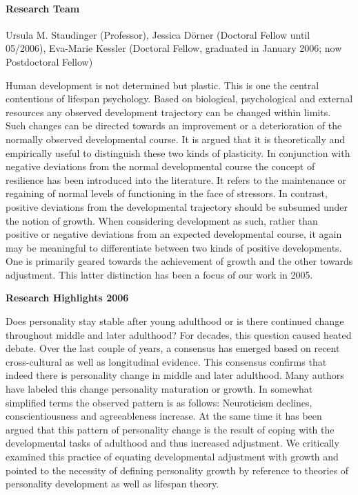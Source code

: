 


\paragraph{Research Team}
Ursula M. Staudinger (Professor), Jessica D\"orner (Doctoral Fellow until 05/2006), Eva-Marie Kessler (Doctoral Fellow, graduated in January 2006; now Postdoctoral Fellow)

Human development is not determined but plastic. This is one the central contentions of lifespan psychology. Based on biological, psychological and external resources any observed development trajectory can be changed within limits. Such changes can be directed towards an improvement or a deterioration of the normally observed developmental course. It is argued that it is theoretically and empirically useful to distinguish these two kinds of plasticity. In conjunction with negative deviations from the normal developmental course the concept of resilience has been introduced into the literature. It refers to the maintenance or regaining of normal levels of functioning in the face of stressors. In contrast, positive deviations from the developmental trajectory should be subsumed under the notion of growth. When considering development as such, rather than positive or negative deviations from an expected developmental course, it again may be meaningful to differentiate between two kinds of positive developments. One is primarily geared towards the achievement of growth and the other towards adjustment. This latter distinction has been a focus of our work in 2005.

\null
\textbf{Research Highlights 2006}

Does personality stay stable after young adulthood or is there continued change throughout middle and later adulthood? For decades, this question caused heated debate. Over the last couple of years, a consensus has emerged based on recent cross-cultural as well as longitudinal evidence. This consensus confirms that indeed there is personality change in middle and later adulthood. Many authors have labeled this change personality maturation or growth. In somewhat simplified terms the observed pattern is as follows: Neuroticism declines, conscientiousness and agreeableness increase. At the same time it has been argued that this pattern of personality change is the result of coping with the developmental tasks of adulthood and thus increased adjustment. We critically examined this practice of equating developmental adjustment with growth and pointed to the necessity of defining personality growth by reference to theories of personality development as well as lifespan theory. 

